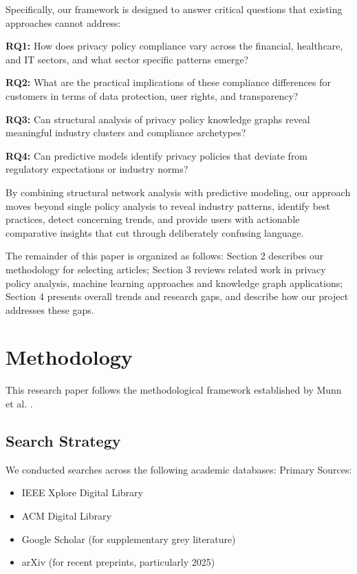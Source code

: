 \documentclass[conference]{IEEEtran}
\begin{document}
Specifically, our framework is designed to answer critical questions that existing approaches cannot address: 

\textbf{RQ1:} How does privacy policy compliance vary across the financial, healthcare, and IT sectors, and what sector specific patterns emerge? 

\textbf{RQ2:} What are the practical implications of these compliance differences for customers in terms of data protection, user rights, and transparency? 


\textbf{RQ3:} Can structural analysis of privacy policy knowledge graphs reveal meaningful industry clusters and compliance archetypes? 


\textbf{RQ4:} Can predictive models identify privacy policies that deviate from regulatory expectations or industry norms? 

By combining structural network analysis with predictive modeling, our approach moves beyond single policy analysis to reveal industry patterns, identify best practices, detect concerning trends, and provide users with actionable comparative insights that cut through deliberately confusing language.


The remainder of this paper is organized as follows: Section 2 describes our methodology for selecting articles; Section 3 reviews related work in privacy policy analysis, machine learning approaches and knowledge graph applications; Section 4 presents overall trends and research gaps, and describe how our project addresses these gaps.


\section{Methodology}
This research paper follows the methodological framework established by Munn et al. \cite{Munn2018SystematicOrScoping}.

\subsection{Search Strategy}
We conducted searches across the following academic databases:
Primary Sources:
\begin{itemize}
    \item IEEE Xplore Digital Library
    \item ACM Digital Library
    \item Google Scholar (for supplementary grey literature)
    \item arXiv (for recent preprints, particularly 2025)
\end{itemize}
\end{document}
